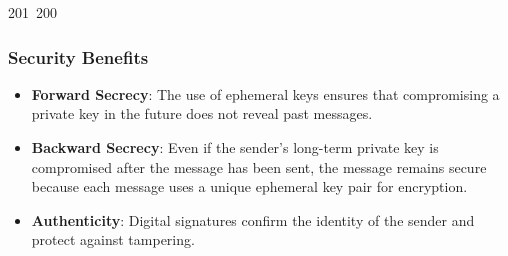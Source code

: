 201~200~\documentclass{article}
\begin{document}
	                                                                                                                                                                                                                                                                                                	                                                                \subsubsection{Security Benefits}
	                                                                                                                                                                                                                                                                                                	                                                                \begin{itemize}
	                                                                                                                                                                                                                                                                                                	                                                                    \item \textbf{Forward Secrecy}: The use of ephemeral keys ensures that compromising a private key in the future does not reveal past messages.  
	                                                                                                                                                                                                                                                                                                	                                                                        \item \textbf{Backward Secrecy}: Even if the sender's long-term private key is compromised after the message has been sent, the message remains secure because each message uses a unique ephemeral key pair for encryption.  
	                                                                                                                                                                                                                                                                                                	                                                                            \item \textbf{Authenticity}: Digital signatures confirm the identity of the sender and protect against tampering.  

\end{itemize}
\end{document}
